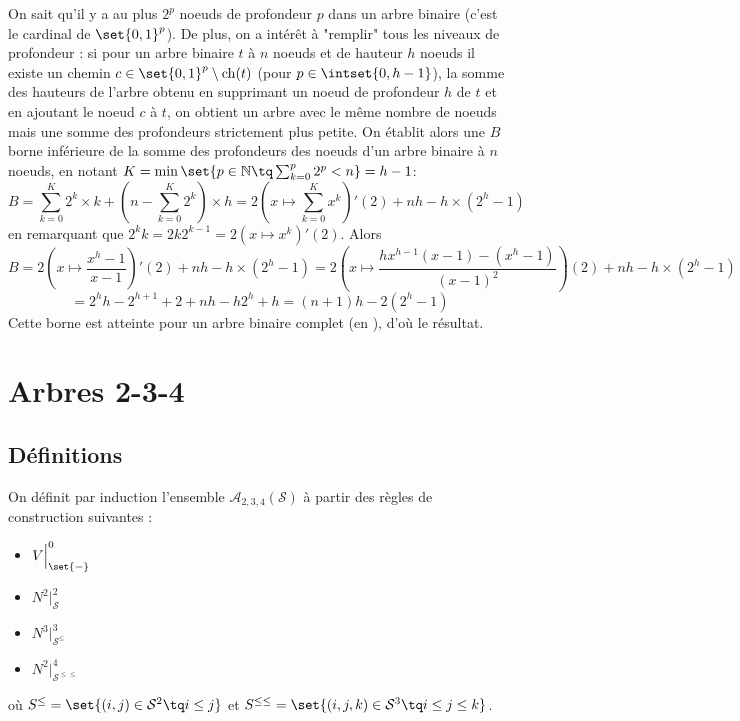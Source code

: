 \documentclass{scrartcl}
\begin{document}
			\begin{demo}
				\item On sait qu'il y a au plus $2^p$ noeuds de profondeur $p$ dans un arbre binaire (c'est le cardinal de $\set{0,1}^p$).
					De plus, on a intérêt à "remplir" tous les niveaux de profondeur : si pour un arbre binaire $t$ à $n$ noeuds et de hauteur $h$ noeuds il existe un chemin $c \in \set{0,1}^p\setminus\mathrm{ch}(t)$ (pour $p \in \intset{0,h-1}$), la somme des hauteurs de l'arbre obtenu en supprimant un noeud de profondeur $h$ de $t$ et en ajoutant le noeud $c$ à $t$, on obtient un arbre avec le même nombre de noeuds mais une somme des profondeurs strictement plus petite.
					On établit alors une $B$ borne inférieure de la somme des profondeurs des noeuds d'un arbre binaire à $n$ noeuds, en notant $K = \min\set{p \in \mathbb{N} \tq \sum_{k=0}^p 2^p < n} = h-1$: 
				\[
					B = \sum_{k=0}^K 2^k\times k + (n-\sum_{k=0}^K 2^k)\times h = 2\left(x\mapsto \sum_{k=0}^K x^k\right)'(2) + nh - h\times(2^h - 1)
				\]
				en remarquant que $2^kk = 2 k 2^{k-1} = 2\left(x \mapsto x^k\right)'(2)$. Alors
				\[
					B = 2\left(x\mapsto \frac{x^h-1}{x-1} \right)'(2) + nh - h\times(2^h - 1) = 2\left(x\mapsto\frac{hx^{h-1}(x-1) - (x^h-1)}{(x-1)^2}\right)(2) + nh - h\times(2^h - 1)
				\]
				\[
					= 2^hh-2^{h+1}+2 + nh - h2^h + h = (n+1)h - 2(2^h-1)
				\]
				Cette borne est atteinte pour un arbre binaire complet (en \exercice), d'où le résultat.
			\end{demo}
	\section{Arbres 2-3-4}
		\subsection{Définitions}
			On définit par induction l'ensemble $\mathscr{A}_{2,3,4}(\mathcal{S})$ à partir des règles de construction suivantes :
			\begin{multicols}{4}
			\begin{itemize}
				\item $V\Big|_{\set{-}}^0$ 
				\item $N^2\Big|_{\mathcal{S}}^2$ 
				\item $N^3\Big|_{\mathcal{S}^\leq}^3$ 
				\item $N^2\Big|_{\mathcal{S}^{\leq\leq}}^4$ 
			\end{itemize}
			\end{multicols}
			où $S^\leq = \set{(i,j) \in \mathcal{S}^2 \tq i \leq j}$ et $S^{\leq\leq} = \set{(i,j,k) \in \mathcal{S}^3 \tq i \leq j \leq k}$.
\end{document}
